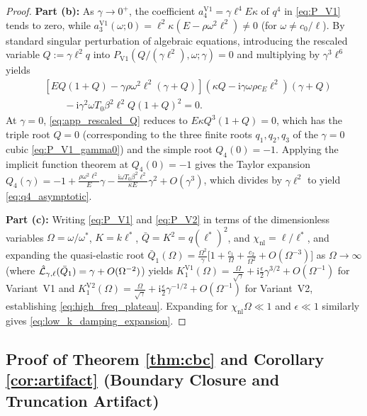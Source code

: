 \begin{proof}
\medskip\noindent\textbf{Part (b):} As $\gamma \to 0^+$, the coefficient $a_4^{\mathrm{V1}} = \gamma\ell^4 E\kappa$ of $q^4$ in \eqref{eq:P_V1} tends to zero, while $a_3^{\mathrm{V1}}(\omega;0) = \ell^2\kappa(E - \rho\omega^2\ell^2) \neq 0$ (for $\omega \neq c_0/\ell$). By standard singular perturbation of algebraic equations, introducing the rescaled variable $Q := \gamma\ell^2 q$ into $P_{\mathrm{V1}}(Q/(\gamma\ell^2),\omega;\gamma) = 0$ and multiplying by $\gamma^3\ell^6$ yields
\begin{align}\label{eq:app_rescaled_Q}
  &\left[E Q(1+Q) - \gamma\rho\omega^2\ell^2(\gamma+Q)\right]\left(\kappa Q - \mathrm{i}\gamma\omega\rho c_E\ell^2\right)(\gamma+Q) \nonumber\\
  &\qquad - \mathrm{i}\gamma^2\omega T_0\beta^2\ell^2 Q(1+Q)^2 = 0.
\end{align}
At $\gamma = 0$, \eqref{eq:app_rescaled_Q} reduces to $E\kappa Q^3(1+Q) = 0$, which has the triple root $Q = 0$ (corresponding to the three finite roots $q_1,q_2,q_3$ of the $\gamma = 0$ cubic \eqref{eq:P_V1_gamma0}) and the simple root $Q_4(0) = -1$. Applying the implicit function theorem at $Q_4(0) = -1$ gives the Taylor expansion $Q_4(\gamma) = -1 + \frac{\rho\omega^2\ell^2}{E}\gamma - \frac{\mathrm{i}\omega T_0\beta^2\ell^2}{\kappa E}\gamma^2 + O(\gamma^3)$, which divides by $\gamma\ell^2$ to yield \eqref{eq:q4_asymptotic}.

\medskip\noindent\textbf{Part (c):} Writing \eqref{eq:P_V1} and \eqref{eq:P_V2} in terms of the dimensionless variables $\Omega = \omega/\omega^*$, $K = k\ell^*$, $\bar{Q} = K^2 = q(\ell^*)^2$, and $\chi_{\mathrm{nl}} = \ell/\ell^*$, and expanding the quasi-elastic root $\bar{Q}_1(\Omega) = \frac{\Omega^2}{\gamma}\big[1 + \frac{c_1}{\Omega} + \frac{c_2}{\Omega^2} + O(\Omega^{-3})\big]$ as $\Omega \to \infty$ (where $\hat{\mathcal{L}}_{\gamma,\ell}(\bar{Q}_1) = \gamma + O(\Omega^{-2})$) yields $K_1^{\mathrm{V1}}(\Omega) = \frac{\Omega}{\sqrt{\gamma}} + \mathrm{i}\frac{\epsilon}{2}\gamma^{3/2} + O(\Omega^{-1})$ for Variant~V1 and $K_1^{\mathrm{V2}}(\Omega) = \frac{\Omega}{\sqrt{\gamma}} + \mathrm{i}\frac{\epsilon}{2}\gamma^{-1/2} + O(\Omega^{-1})$ for Variant~V2, establishing \eqref{eq:high_freq_plateau}. Expanding for $\chi_{\mathrm{nl}}\Omega \ll 1$ and $\epsilon \ll 1$ similarly gives \eqref{eq:low_k_damping_expansion}.
\end{proof}

\subsection{Proof of Theorem \ref{thm:cbc} and Corollary \ref{cor:artifact} (Boundary Closure and Truncation Artifact)}\label{app:proof_thm3}

